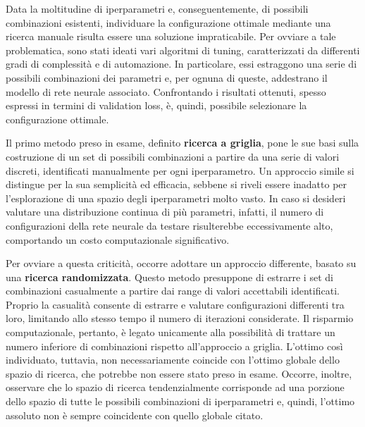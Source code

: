 Data la moltitudine di iperparametri e, conseguentemente, di possibili combinazioni esistenti, individuare la configurazione ottimale mediante una ricerca manuale risulta essere una soluzione impraticabile. Per ovviare a tale problematica, sono stati ideati vari algoritmi di tuning, caratterizzati da differenti gradi di complessità e di automazione. In particolare, essi estraggono una serie di possibili combinazioni dei parametri e, per ognuna di queste, addestrano il modello di rete neurale associato. Confrontando i risultati ottenuti, spesso espressi in termini di validation loss, è, quindi, possibile selezionare la configurazione ottimale.

Il primo metodo preso in esame, definito \textbf{ricerca a griglia}, pone le sue basi sulla costruzione di un set di possibili combinazioni a partire da una serie di valori discreti, identificati manualmente per ogni iperparametro. Un approccio simile si distingue per la sua semplicità ed efficacia, sebbene si riveli essere inadatto per l'esplorazione di una spazio degli iperparametri molto vasto. In caso si desideri valutare una distribuzione continua di più parametri, infatti, il numero di configurazioni della rete neurale da testare risulterebbe eccessivamente alto, comportando un costo computazionale significativo. 

Per ovviare a questa criticità, occorre adottare un approccio differente, basato su una \textbf{ricerca randomizzata}. Questo metodo presuppone di estrarre i set di combinazioni casualmente a partire dai range di valori accettabili identificati. Proprio la casualità consente di estrarre e valutare configurazioni differenti tra loro, limitando allo stesso tempo il numero di iterazioni considerate. Il risparmio computazionale, pertanto, è legato unicamente alla possibilità di trattare un numero inferiore di combinazioni rispetto all'approccio a griglia. L'ottimo così individuato, tuttavia, non necessariamente coincide con l'ottimo globale dello spazio di ricerca, che potrebbe non essere stato preso in esame. Occorre, inoltre, osservare che lo spazio di ricerca tendenzialmente corrisponde ad una porzione dello spazio di tutte le possibili combinazioni di iperparametri e, quindi, l'ottimo assoluto non è sempre coincidente con quello globale citato.


